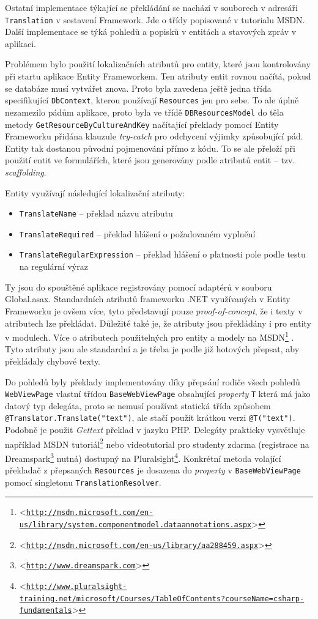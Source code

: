 \documentclass[11pt,twoside,a4paper]{book}
\let\oldUrl\url
\renewcommand\url[1]{<\texttt{\oldUrl{#1}}>}
\begin{document}
Ostatní implementace týkající se překládání se nachází v souborech v adresáři \texttt{Translation} v sestavení \textsf{Framework}. Jde o třídy popisované v tutorialu MSDN\cite{resources}. Další implementace se týká pohledů a popisků v entitách a stavových zpráv v aplikaci.

Problémem bylo použití lokalizačních atributů pro entity, které jsou kontrolovány při startu aplikace Entity Frameworkem. Ten atributy entit rovnou načítá, pokud se databáze musí vytvářet znova. Proto byla zavedena ještě jedna třída specifikující \texttt{DbContext}, kterou používají \texttt{Resources} jen pro sebe. To ale úplně nezamezilo pádům aplikace, proto byla ve třídě \texttt{DBResourcesModel} do těla metody \texttt{GetResourceByCultureAndKey} načítající překlady pomocí Entity Frameworku přidána klauzule \textit{try-catch} pro odchycení výjimky způsobující pád. Entity tak dostanou původní pojmenování přímo z kódu. To se ale přeloží při použití entit ve formulářích, které jsou generovány podle atributů entit -- tzv. \textit{scaffolding}.

Entity využívají následující lokalizační atributy:

\begin{itemize}
\item \texttt{TranslateName} -- překlad názvu atributu
\item \texttt{TranslateRequired} -- překlad hlášení o požadovaném vyplnění
\item \texttt{TranslateRegularExpression} -- překlad hlášení o platnosti pole podle testu na regulární výraz
\end{itemize}

Ty jsou do spouštěné aplikace registrovány pomocí adaptérů v souboru \textsf{Global.asax}. Standardních atributů frameworku .NET využívaných v Entity Frameworku je ovšem více, tyto představují pouze \textit{proof-of-concept}, že i texty v atributech lze překládat. Důležité také je, že atributy jsou překládány i pro entity v modulech. Více o atributech použitelných pro entity a modely na MSDN\footnote{\url{http://msdn.microsoft.com/en-us/library/system.componentmodel.dataannotations.aspx}} . Tyto atributy jsou ale standardní a je třeba je podle již hotových přepsat, aby překládaly chybové texty.

Do pohledů byly překlady implementovány díky přepsání rodiče všech pohledů \texttt{Web\-View\-Page} vlastní třídou \texttt{BaseWebViewPage} obsahující \textit{property} \texttt{T} která má jako datový typ delegáta, proto se nemusí používat statická třída způsobem \texttt{@Translator.Translate("text")}, ale stačí použít krátkou verzi \texttt{@T("text")}. Podobně je použit \textit{Gettext} překlad v jazyku \textsf{PHP}. Delegáty prakticky vysvětluje například MSDN tutoriál\footnote{\url{http://msdn.microsoft.com/en-us/library/aa288459.aspx}} nebo videotutorial pro studenty zdarma (registrace na Dreamspark\footnote{\url{http://www.dreamspark.com}} nutná) dostupný na Pluralsight\footnote{\url{http://www.pluralsight-training.net/microsoft/Courses/TableOfContents?courseName=csharp-fundamentals}}.
Konkrétní metoda volající překladač z přepsaných \texttt{Resources} je dosazena do \textit{property} v \texttt{BaseWebViewPage} pomocí singletonu \texttt{TranslationResolver}.
\end{document}
